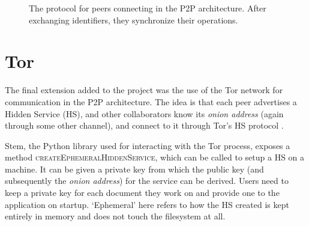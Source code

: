 \documentclass[diss.tex]{subfiles}
\begin{document}
\begin{figure}[H]
\centering
{}
\caption{The protocol for peers connecting in the P2P architecture. After exchanging identifiers, they synchronize their operations.}
\label{fig:protocol}
\end{figure}


\section{Tor}

The final extension added to the project was the use of the Tor network for communication in the P2P architecture. The idea is that each peer advertises a Hidden Service (HS), and other collaborators know its \textit{onion address} (again through some other channel), and connect to it through Tor's HS protocol \cite{torrendspec}. 

Stem, the Python library used for interacting with the Tor process, exposes a method \textsc{createEphemeralHiddenService}, which can be called to setup a HS on a machine. It can be given a private key from which the public key (and subsequently the \textit{onion address}) for the service can be derived. Users need to keep a private key for each document they work on and provide one to the application on startup. `Ephemeral' here refers to how the HS created is kept entirely in memory and does not touch the filesystem at all. 
\end{document}

